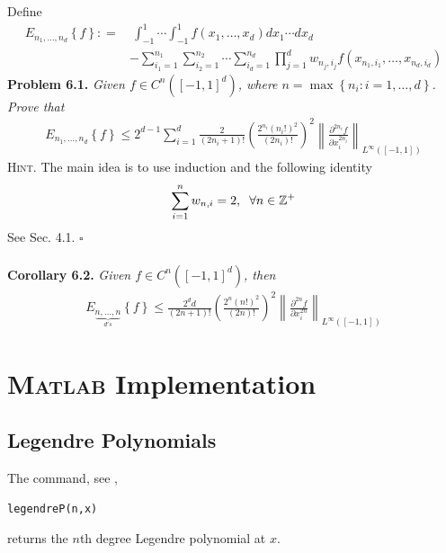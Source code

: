 \documentclass[a4paper]{article}
\numberwithin{equation}{section}
\begin{document}
Define
\begin{align}
{E_{{n_1}, \ldots ,{n_d}}}\left\{ f \right\}: =&\ \int_{ - 1}^1 { \cdots \int_{ - 1}^1 {f\left( {{x_1}, \ldots ,{x_d}} \right)d{x_1} \cdots d{x_d}} }  \\
&- \sum\limits_{{i_1} = 1}^{{n_1}} {\sum\limits_{{i_2} = 1}^{{n_2}}  \cdots  \sum\limits_{{i_d} = 1}^{{n_d}} {\prod\limits_{j = 1}^d {{w_{{n_j},{i_j}}}} f\left( {{x_{{n_1},{i_1}}}, \ldots ,{x_{{n_d},{i_d}}}} \right)} } 
\end{align}
\textbf{Problem 6.1.} \textit{Given $f \in {C^n}\left( {{{\left[ { - 1,1} \right]}^d}} \right)$, where $n = \max \left\{ {{n_i}:i = 1, \ldots ,d} \right\}$. Prove that }
\begin{align}
{E_{{n_1}, \ldots ,{n_d}}}\left\{ f \right\} \le {2^{d - 1}}\sum\limits_{i = 1}^d {\frac{2}{{\left( {2{n_i} + 1} \right)!}}{{\left( {\frac{{{2^{{n_i}}}{{\left( {{n_i}!} \right)}^2}}}{{\left( {2{n_i}} \right)!}}} \right)}^2}{{\left\| {\frac{{{\partial ^{2{n_i}}}f}}{{\partial x_i^{{2n_i}}}}} \right\|}_{{L^\infty }\left( {\left[ { - 1,1} \right]} \right)}}} 
\end{align}
\textsc{Hint.} The main idea is to use induction and the following identity
\begin{align}
\sum\limits_{i = 1}^n {{w_{n,i}}}  = 2,\hspace{0.2cm}\forall n \in {\mathbb{Z}^ + }
\end{align}
See Sec. 4.1. \hfill $\square$\\
\\
\textbf{Corollary 6.2.} \textit{Given $f \in {C^n}\left( {{{\left[ { - 1,1} \right]}^d}} \right)$, then}
\begin{align}
{E_{\underbrace {n, \ldots ,n}_{d's}}}\left\{ f \right\} \le \frac{{{2^d}d}}{{\left( {2n + 1} \right)!}}{\left( {\frac{{{2^n}{{\left( {n!} \right)}^2}}}{{\left( {2n} \right)!}}} \right)^2}{\left\| {\frac{{{\partial ^{2n}}f}}{{\partial x_i^{2n}}}} \right\|_{{L^\infty }\left( {\left[ { - 1,1} \right]} \right)}}
\end{align}

\section{\textsc{Matlab} Implementation}
\subsection{Legendre Polynomials}
The command, see \cite{3},
\begin{verbatim}
legendreP(n,x)
\end{verbatim}
returns the $n$th degree Legendre polynomial at $x$.
\end{document}
